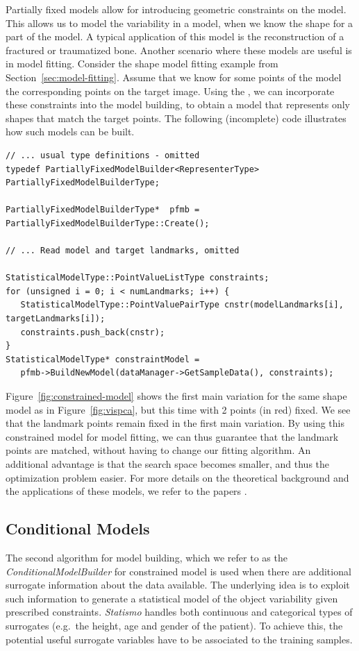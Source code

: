 \documentclass{InsightArticle}
\newcommand{\Statismo}{\emph{Statismo}\xspace}
\begin{document}
Partially fixed models allow for introducing geometric constraints on
the model. This allows us to model the variability in a model, when we know the shape for a part of the model.
A typical application of this model is the reconstruction of a fractured or traumatized bone. 
Another scenario where these models are useful is in model fitting. 
Consider the shape model fitting example from Section~\ref{sec:model-fitting}. Assume
that we know for some points of the model the corresponding points on the target image. 
Using the , we can
incorporate these constraints into the model building, to obtain a
model that represents only shapes that match the target points.  The
following (incomplete) code illustrates how such models can be built.

\begin{verbatim}
// ... usual type definitions - omitted
typedef PartiallyFixedModelBuilder<RepresenterType> PartiallyFixedModelBuilderType;

PartiallyFixedModelBuilderType*  pfmb = PartiallyFixedModelBuilderType::Create();

// ... Read model and target landmarks, omitted

StatisticalModelType::PointValueListType constraints;
for (unsigned i = 0; i < numLandmarks; i++) { 
   StatisticalModelType::PointValuePairType cnstr(modelLandmarks[i], targetLandmarks[i]);
   constraints.push_back(cnstr);
}
StatisticalModelType* constraintModel = 
   pfmb->BuildNewModel(dataManager->GetSampleData(), constraints);
\end{verbatim}
Figure~\ref{fig:constrained-model} shows the first main variation for
the same shape model as in Figure~\ref{fig:vispca}, but this time with
2 points (in red) fixed. We see that the landmark points remain fixed
in the first main variation.  By using this constrained model for model fitting, we can thus guarantee that
the landmark points are matched, without having to change our fitting
algorithm. An additional advantage is that the search space becomes
smaller, and thus the optimization problem easier.  For more details
on the theoretical background and the applications of these models, we
refer to the papers \cite{luthi_probabilistic_2009,luthi_using_2011}.

\subsection{Conditional Models}
The second algorithm for model building, which we refer to as the
\emph{ConditionalModelBuilder} for constrained model is used when
there are additional surrogate information about the data available.
The underlying idea is to exploit such information to generate a
statistical model of the object variability given prescribed
constraints. \Statismo handles both continuous and categorical types
of surrogates (e.g.\ the height, age and gender of the patient).  To achieve this, the potential useful surrogate
variables have to be associated to the training samples.
\end{document}
